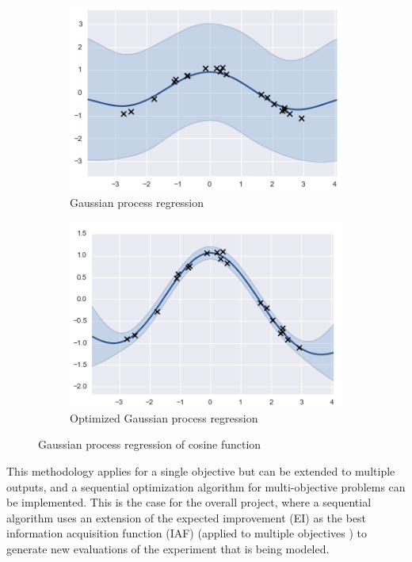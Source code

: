 \documentclass{article}
\begin{document}
\begin{figure}
\centering
	\begin{subfigure}[b]{0.4\textwidth}
        \includegraphics[width=\textwidth]{gp_cosine.png}
        \caption{Gaussian process regression}
        \label{gp}
	\end{subfigure}

	\begin{subfigure}[b]{0.4\textwidth}
        \includegraphics[width=\textwidth]{gp_cosine_optimized.png}
	    \caption{Optimized Gaussian process regression}
	    \label{gp_optimized}
	\end{subfigure}
\caption{Gaussian process regression of cosine function}
\label{gp_regression}
\end{figure}

This methodology applies for a single objective but can be extended to multiple outputs, and a sequential optimization algorithm for multi-objective problems can be implemented. This is the case for the overall project, where a sequential algorithm uses an extension of the expected improvement (EI) as the best information acquisition function (IAF)\cite{Jones2001} (applied to multiple objectives \cite{wagner2010expected}) to generate new evaluations of the experiment that is being modeled.
\end{document}
